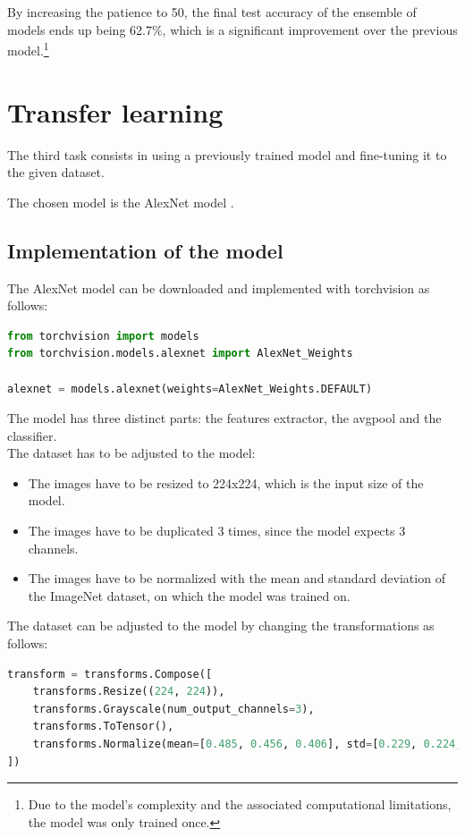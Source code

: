 \documentclass[a4paper, 11pt]{article}
\begin{document}
By increasing the patience to 50, the final test accuracy of the ensemble of models ends up being 62.7\%, 
which is a significant improvement over the previous model.\footnote{Due to the model's complexity and the associated computational limitations, the model was only trained once.}

\section{Transfer learning}
The third task consists in using a previously trained model and fine-tuning it to the given dataset.

The chosen model is the AlexNet model \cite{krizhevsky2012imagenet}.

\subsection{Implementation of the model}
The AlexNet model can be downloaded and implemented with torchvision as follows:
\begin{lstlisting}[language=Python]
from torchvision import models
from torchvision.models.alexnet import AlexNet_Weights

alexnet = models.alexnet(weights=AlexNet_Weights.DEFAULT)
\end{lstlisting}

The model has three distinct parts: the features extractor, the avgpool and the classifier.\\
The dataset has to be adjusted to the model:
\begin{itemize}
    \item The images have to be resized to 224x224, which is the input size of the model.
    \item The images have to be duplicated 3 times, since the model expects 3 channels.
    \item The images have to be normalized with the mean and standard deviation of the ImageNet dataset, on which the model was trained on.
\end{itemize}
The dataset can be adjusted to the model by changing the transformations as follows:
\begin{lstlisting}[language=Python]
transform = transforms.Compose([
    transforms.Resize((224, 224)),
    transforms.Grayscale(num_output_channels=3),
    transforms.ToTensor(),
    transforms.Normalize(mean=[0.485, 0.456, 0.406], std=[0.229, 0.224, 0.225])
])
\end{lstlisting}
\end{document}
